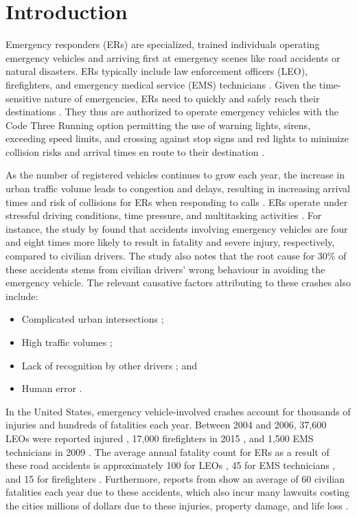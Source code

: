 \chapter{Introduction}
Emergency responders (ERs) are specialized, trained individuals operating emergency vehicles and arriving first at emergency scenes like road accidents or natural disasters. ERs typically include law enforcement officers (LEO), firefighters, and emergency medical service (EMS) technicians \cite{Hsiao2018}. Given the time-sensitive nature of emergencies, ERs need to quickly and safely reach their destinations \cite{Al-Ghamdi2002}. They thus are authorized to operate emergency vehicles with the Code Three Running option permitting the use of warning lights, sirens, exceeding speed limits, and crossing against stop signs and red lights to minimize collision risks and arrival times en route to their destination \cite{Hsiao2018, Al-Ghamdi2002, Buchenscheit2009}.

As the number of registered vehicles continues to grow each year, the increase in urban traffic volume leads to congestion and delays, resulting in increasing arrival times and risk of collisions for ERs when responding to calls \cite{Vlad2008}. ERs operate under stressful driving conditions, time pressure, and multitasking activities \cite{Hsiao2018}. For instance, the study by \cite{Buchenscheit2009} found that accidents involving emergency vehicles are four and eight times more likely to result in fatality and severe injury, respectively, compared to civilian drivers. The study also notes that the root cause for 30\% of these accidents stems from civilian drivers' wrong behaviour in avoiding the emergency vehicle. The relevant causative factors attributing to these crashes also include:

\begin{itemize}
	\item Complicated urban intersections \cite{Hsiao2018, Retting1995};
	\item High traffic volumes \cite{Hsiao2018, Vlad2008};
	\item Lack of recognition by other drivers \cite{Hsiao2018, Vlad2008, Sukru2020}; and
	\item Human error \cite{Buchenscheit2009, Sukru2020}.
\end{itemize}

In the United States, emergency vehicle-involved crashes account for thousands of injuries and hundreds of fatalities each year. Between 2004 and 2006, 37,600 LEOs were reported injured \cite{Hsiao2018}, 17,000 firefighters in 2015 \cite{Hsiao2018}, and 1,500 EMS technicians in 2009 \cite{Hsiao2018}. The average annual fatality count for ERs as a result of these road accidents is approximately 100 for LEOs \cite{Hsiao2018, Emergency-Vehicles2020, Enforcement-Safety2020}, 45 for EMS technicians \cite{Hsiao2018, Emergency-Vehicles2020}, and 15 for firefighters \cite{Hsiao2018, Emergency-Vehicles2020}. Furthermore, reports from \cite{Hsiao2018} show an average of 60 civilian fatalities each year due to these accidents, which also incur many lawsuits costing the cities millions of dollars due to these injuries, property damage, and life loss \cite{Hsiao2018}.


